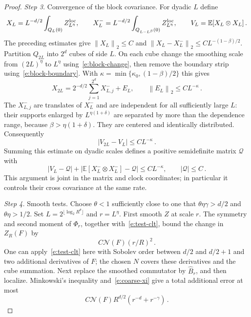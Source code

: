 \documentclass[11pt]{amsart}
\theoremstyle{definition}
\theoremstyle{remark}
\numberwithin{equation}{section}
\newcommand{\E}{\mathbb E}
\newcommand{\norm}[1]{\left\|#1\right\|}
\begin{document}
\begin{proof}
\emph{Step 3.} Convergence of the block covariance. For dyadic $L$ define
\begin{equation*}
 X_L=L^{-d/2}\int_{Q_L(0)}Z_{L^\eta}^{\rm loc},\qquad
 X_L^-=L^{-d/2}\int_{Q_{L-L^\beta}(0)}Z_{L^\eta}^{\rm loc},
 \qquad V_L=\E[X_L\otimes X_L]\, .
\end{equation*}
The preceding estimates give $\norm{X_L}_2\leq C$ and $\norm{X_L-X_L^-}_2\leq CL^{-(1-\beta)/2}$. Partition $Q_{2L}$ into $2^d$ cubes of side $L$. On each cube change the smoothing scale from $(2L)^\eta$ to $L^\eta$ using~\eqref{e:block-change}, then remove the boundary strip using~\eqref{e:block-boundary}. With $\kappa=\min\{\kappa_0,(1-\beta)/2\}$ this gives
\begin{equation}\label{e:block-recursion}
 X_{2L}=2^{-d/2}\sum_{j=1}^{2^d}X_{L,j}^-+E_L,
 \qquad \norm{E_L}_2\leq CL^{-\kappa}\, .
\end{equation}
The $X_{L,j}^-$ are translates of $X_L^-$ and are independent for all sufficiently large $L$: their supports enlarged by $L^{\eta(1+\delta)}$ are separated by more than the dependence range, because $\beta>\eta(1+\delta)$. They are centered and identically distributed. Consequently
\begin{equation*}
 |V_{2L}-V_L|\leq CL^{-\kappa}\, .
\end{equation*}
Summing this estimate on dyadic scales defines a positive semidefinite matrix $\mathcal Q$ with
\begin{equation}\label{e:block-cov-rate}
 |V_L-\mathcal Q|+
 |\E[X_L^-\otimes X_L^-]-\mathcal Q|
 \leq CL^{-\kappa},\qquad |\mathcal Q|\leq C\, .
\end{equation}
This argument is joint in the matrix and clock coordinates; in particular it controls their cross covariance at the same rate.

\emph{Step 4.} Smooth tests. Choose $\theta<1$ sufficiently close to one that $\theta\eta\gamma>d/2$ and $\theta\eta>1/2$. Set $L=2^{\lfloor\log_2 R^\theta\rfloor}$ and $r=L^\eta$. First smooth $Z$ at scale $r$. The symmetry and second moment of $\Phi_r$, together with~\eqref{e:test-clt}, bound the change in $Z_R(F)$ by
\begin{equation*}
 C\mathcal N(F)(r/R)^2\, .
\end{equation*}
One can apply~\eqref{e:test-clt} here with Sobolev order between $d/2$ and $d/2+1$ and two additional derivatives of $F$; the chosen $N$ covers these derivatives and the cube summation. Next replace the smoothed commutator by $\widehat B_r$, and then localize. Minkowski's inequality and~\eqref{e:coarse-xi} give a total additional error at most
\begin{equation}\label{e:replacement-error}
 C\mathcal N(F)R^{d/2}(r^{-d}+r^{-\gamma})\, .
\end{equation}


\end{proof}
\end{document}
